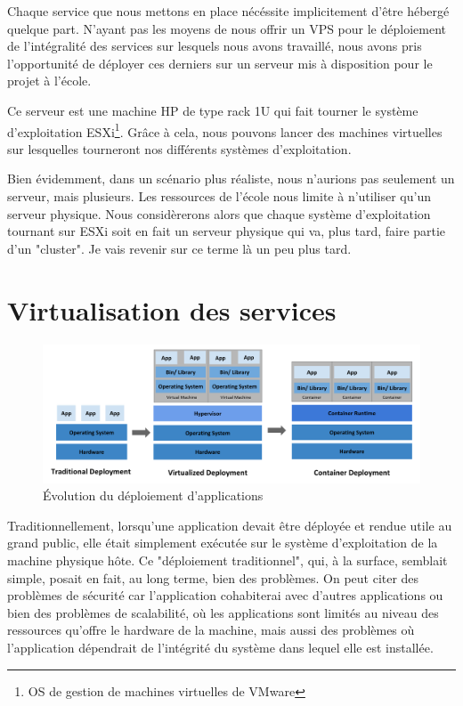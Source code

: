 Chaque service que nous mettons en place nécéssite implicitement d'être hébergé quelque part. N'ayant pas les moyens de nous offrir un VPS pour le déploiement de l'intégralité des services sur lesquels nous avons travaillé, nous avons pris l'opportunité de déployer ces derniers sur un serveur mis à disposition pour le projet à l'école.

Ce serveur est une machine HP de type rack 1U qui fait tourner le système d'exploitation ESXi\footnote{OS de gestion de machines virtuelles de VMware}. Grâce à cela, nous pouvons lancer des machines virtuelles sur lesquelles tourneront nos différents systèmes d'exploitation.

Bien évidemment, dans un scénario plus réaliste, nous n'aurions pas seulement un serveur, mais plusieurs. Les ressources de l'école nous limite à n'utiliser qu'un serveur physique. Nous considèrerons alors que chaque système d'exploitation tournant sur ESXi soit en fait un serveur physique qui va, plus tard, faire partie d'un "cluster". Je vais revenir sur ce terme là un peu plus tard.

\section{Virtualisation des services}

\begin{figure}[H]
    \centering
    \includegraphics[width=\textwidth]{./img/container_evolution.png}
    \caption{Évolution du déploiement d'applications \cite{shavidissa2019}}
    \label{fig:container_evolution}
\end{figure}

Traditionnellement, lorsqu'une application devait être déployée et rendue utile au grand public, elle était simplement exécutée sur le système d'exploitation de la machine physique hôte. Ce "déploiement traditionnel", qui, à la surface, semblait simple, posait en fait, au long terme, bien des problèmes. On peut citer des problèmes de sécurité car l'application cohabiterai avec d'autres applications ou bien des problèmes de scalabilité, où les applications sont limités au niveau des ressources qu'offre le hardware de la machine, mais aussi des problèmes où l'application dépendrait de l'intégrité du système dans lequel elle est installée.

